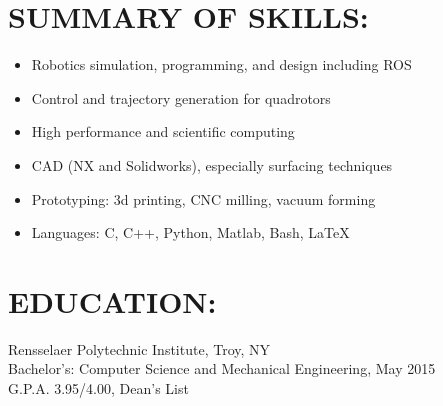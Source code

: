 \begin{resume}                        
\vspace{-1.5mm}
\section{SUMMARY OF SKILLS:}
\vspace{10mm}
  \begin{itemize}
    \item Robotics simulation, programming, and design including ROS
    \item Control and trajectory generation for quadrotors
    \item High performance and scientific computing
    \item CAD (NX and Solidworks), especially surfacing techniques
    \item Prototyping: 3d printing, CNC milling, vacuum forming
    \item Languages: C, C++, Python, Matlab, Bash, \LaTeX
	\end{itemize}
\vspace{-3.5mm}
\section{EDUCATION:}
	Rensselaer Polytechnic Institute, Troy, NY \\
	Bachelor's: Computer Science and Mechanical Engineering, May 2015 \\
	G.P.A. 3.95/4.00, Dean's List
\vspace{-4.5mm}

\end{resume}
